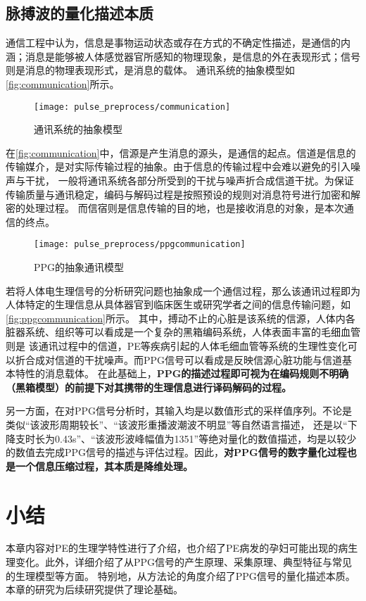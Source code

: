\subsection{脉搏波的量化描述本质}
通信工程中认为，信息是事物运动状态或存在方式的不确定性描述，是通信的内涵；消息是能够被人体感觉器官所感知的物理现象，是信息的外在表现形式；信号则是消息的物理表现形式，是消息的载体\cite{Shannon1948,Liu2019,Zhao2017}。
通讯系统的抽象模型如\autoref{fig:communication}所示。
\begin{figure}[htbp]
    \centering
    \texttt{[image: pulse\_preprocess/communication]}
    \caption[通讯系统的抽象模型]{\label{fig:communication}通讯系统的抽象模型\cite{Zhao2017,Liu2019}}
\end{figure}

在\autoref{fig:communication}中，信源是产生消息的源头，是通信的起点。信道是信息的传输媒介，是对实际传输过程的抽象。由于信息的传输过程中会难以避免的引入噪声与干扰，
一般将通讯系统各部分所受到的干扰与噪声折合成信道干扰。为保证传输质量与通讯稳定，编码与解码过程是按照预设的规则对消息符号进行加密和解密的处理过程。
而信宿则是信息传输的目的地，也是接收消息的对象，是本次通信的终点\cite{Zhao2017}。

\begin{figure}[htbp]
    \centering
    \texttt{[image: pulse\_preprocess/ppgcommunication]}
    \caption{\label{fig:ppgcommunication}PPG的抽象通讯模型}
\end{figure}

若将人体电生理信号的分析研究问题也抽象成一个通信过程，那么该通讯过程即为人体特定的生理信息从具体器官到临床医生或研究学者之间的信息传输问题，如\autoref{fig:ppgcommunication}所示。
其中，搏动不止的心脏是该系统的信源，人体内各脏器系统、组织等可以看成是一个复杂的黑箱编码系统，人体表面丰富的毛细血管则是
该通讯过程中的信道，PE等疾病引起的人体毛细血管等系统的生理性变化可以折合成对信道的干扰噪声。而PPG信号可以看成是反映信源心脏功能与信道基本特性的消息载体。
在此基础上，\textbf{PPG的描述过程即可视为在编码规则不明确（黑箱模型）的前提下对其携带的生理信息进行译码解码的过程。}

另一方面，在对PPG信号分析时，其输入均是以数值形式的采样值序列。不论是类似“该波形周期较长”、“该波形重播波潮波不明显”等自然语言描述，
还是以“下降支时长为0.43s”、“该波形波峰幅值为1351”等绝对量化的数值描述，均是以较少的数值去完成PPG信号的描述与评估过程。因此，\textbf{对PPG信号的数字量化过程也是一个信息压缩过程，其本质是降维处理。}

\section{小结}
本章内容对PE的生理学特性进行了介绍，也介绍了PE病发的孕妇可能出现的病生理变化。此外，详细介绍了从PPG信号的产生原理、采集原理、典型特征与常见的生理模型等方面。
特别地，从方法论的角度介绍了PPG信号的量化描述本质。本章的研究为后续研究提供了理论基础。